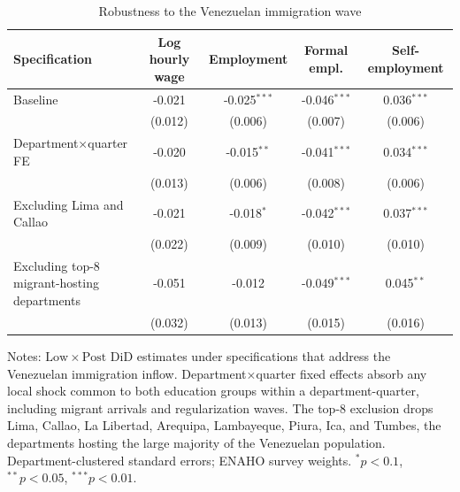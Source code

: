 \begin{table}[!tbp]\centering
\caption{Robustness to the Venezuelan immigration wave}\label{tab:migration}
\begin{threeparttable}
\footnotesize
\setlength{\tabcolsep}{4pt}
\begin{tabular}{lcccc}
\toprule
Specification & Log hourly wage & Employment & Formal empl. & Self-employment \\
\midrule
Baseline & -0.021 & -0.025$^{***}$ & -0.046$^{***}$ & 0.036$^{***}$ \\
 & (0.012) & (0.006) & (0.007) & (0.006) \\
Department$\times$quarter FE & -0.020 & -0.015$^{**}$ & -0.041$^{***}$ & 0.034$^{***}$ \\
 & (0.013) & (0.006) & (0.008) & (0.006) \\
Excluding Lima and Callao & -0.021 & -0.018$^{*}$ & -0.042$^{***}$ & 0.037$^{***}$ \\
 & (0.022) & (0.009) & (0.010) & (0.010) \\
Excluding top-8 migrant-hosting departments & -0.051 & -0.012 & -0.049$^{***}$ & 0.045$^{**}$ \\
 & (0.032) & (0.013) & (0.015) & (0.016) \\
\bottomrule
\end{tabular}
\begin{tablenotes}\footnotesize
\item Notes: $\mathrm{Low}\times\mathrm{Post}$ DiD estimates under specifications that address the Venezuelan immigration inflow. Department$\times$quarter fixed effects absorb any local shock common to both education groups within a department-quarter, including migrant arrivals and regularization waves. The top-8 exclusion drops Lima, Callao, La Libertad, Arequipa, Lambayeque, Piura, Ica, and Tumbes, the departments hosting the large majority of the Venezuelan population. Department-clustered standard errors; ENAHO survey weights. $^{*}p<0.1$, $^{**}p<0.05$, $^{***}p<0.01$.
\end{tablenotes}
\end{threeparttable}\end{table}
